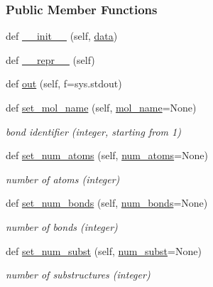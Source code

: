 \subsubsection*{Public Member Functions}
\begin{DoxyCompactItemize}
\item 
def \hyperlink{classsrc_1_1Mol2_1_1mol2_a7ad6f25ea3ef6bd468e4d684dfd27e07}{\+\_\+\+\_\+init\+\_\+\+\_\+} (self, \hyperlink{namespacesrc_1_1Mol2_a12bf18db47042b1704de5e1fb05b2ade}{data})
\item 
def \hyperlink{classsrc_1_1Mol2_1_1mol2_a505da0d6fcf8fa95c637ad52b0ddb890}{\+\_\+\+\_\+repr\+\_\+\+\_\+} (self)
\item 
def \hyperlink{classsrc_1_1Mol2_1_1mol2_ad137b57786b1b387bfa868e096f501f2}{out} (self, f=sys.\+stdout)
\item 
def \hyperlink{classsrc_1_1Mol2_1_1mol2_a51e365cc7be6edceb1d526396d28b1d1}{set\+\_\+mol\+\_\+name} (self, \hyperlink{classsrc_1_1Mol2_1_1mol2_aedcbab63ca041f50457a2fb89c3c972b}{mol\+\_\+name}=None)
\begin{DoxyCompactList}\small\item\em bond identifier (integer, starting from 1) \end{DoxyCompactList}\item 
def \hyperlink{classsrc_1_1Mol2_1_1mol2_a691b925e96c82a1dafb1e59fbf006bbf}{set\+\_\+num\+\_\+atoms} (self, \hyperlink{classsrc_1_1Mol2_1_1mol2_a59f5f0db5c54ee3d283dc7f5f7516ad9}{num\+\_\+atoms}=None)
\begin{DoxyCompactList}\small\item\em number of atoms (integer) \end{DoxyCompactList}\item 
def \hyperlink{classsrc_1_1Mol2_1_1mol2_a2c8664f56c4b79f2810ef4b0a088d294}{set\+\_\+num\+\_\+bonds} (self, \hyperlink{classsrc_1_1Mol2_1_1mol2_a7cda1518d6b086f18bdbe38358bf64e0}{num\+\_\+bonds}=None)
\begin{DoxyCompactList}\small\item\em number of bonds (integer) \end{DoxyCompactList}\item 
def \hyperlink{classsrc_1_1Mol2_1_1mol2_ad2a26c5f15a9f978a21f197eefd1bdf5}{set\+\_\+num\+\_\+subst} (self, \hyperlink{classsrc_1_1Mol2_1_1mol2_acb2006979cf623c41bb9bc71231a8146}{num\+\_\+subst}=None)
\begin{DoxyCompactList}\small\item\em number of substructures (integer) \end{DoxyCompactList}\item 

\end{DoxyCompactItemize}
